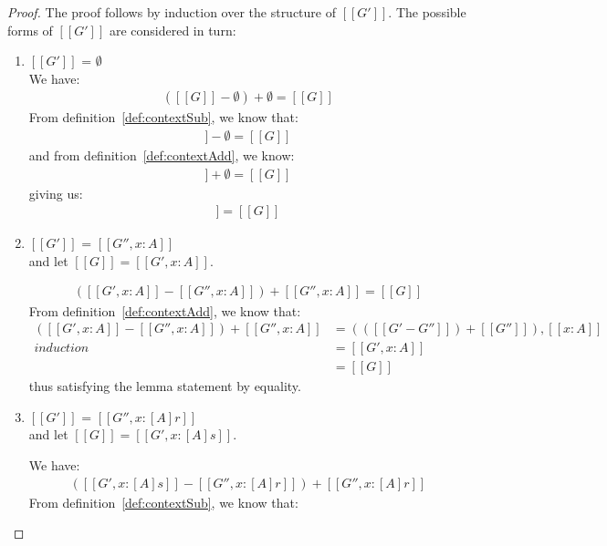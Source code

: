 \begin{proof}
 The proof follows by induction over the structure of $[[G']]$. The possible
 forms of $[[G']]$ are considered in turn:
 \begin{enumerate}
     \item $[[G']]$ = $\emptyset$\\
     We have:
     \begin{align*}
       ([[G]] - \emptyset) + \emptyset = [[G]]
     \end{align*}
     From definition~\ref{def:contextSub}, we know that:
     \begin{align*}
       [[G]] - \emptyset = [[G]]
     \end{align*}
     and from definition~\ref{def:contextAdd}, we know:
     \begin{align*}
       [[G]] + \emptyset = [[G]]
     \end{align*}
     giving us:
     \begin{align*}
       [[G]] = [[G]]
     \end{align*}


     \item $[[G']]$ = $[[G'', x : A]]$\\
     and let $[[ G ]] = [[ G', x : A ]]$.

     \begin{align*}
       ([[G', x : A]] - [[G'', x : A]]) + [[G'', x : A]] = [[G]]
     \end{align*}
     From definition~\ref{def:contextAdd}, we know that:
     \begin{align*}
       ([[G', x : A]] - [[G'', x : A]]) + [[G'', x : A]]
       & =  (([[G' - G'']]) + [[G'']]), [[x : A]] \\
 \textit{induction}  & = [[ G', x : A ]] \\
                     & = [[ G ]]
     \end{align*}
     thus satisfying the lemma statement by equality.

     \item $[[G']]$ = $[[G'', x : [A] r]]$\\
       and let $[[ G ]] = [[ G', x : [A] s ]]$.

     We have:
     \begin{align*}
       ([[G', x : [A] s]] - [[G'', x : [A] r]]) + [[G'', x : [A] r ]]
     \end{align*}
     From definition~\ref{def:contextSub}, we know that:


\end{enumerate}
\end{proof}

